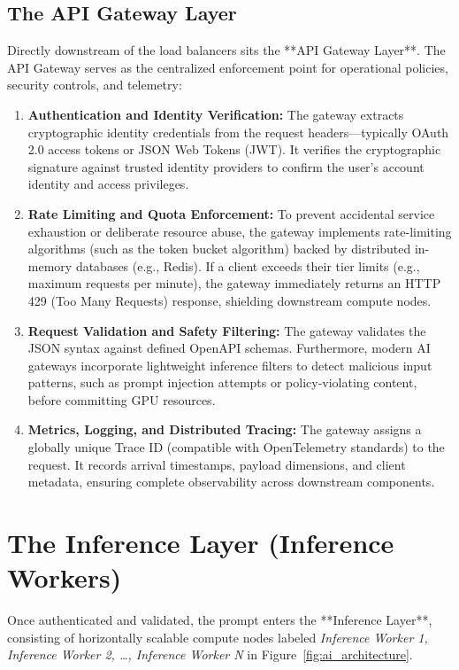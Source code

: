\documentclass[12pt,a4paper]{report}
\begin{document}
\subsection{The API Gateway Layer}
Directly downstream of the load balancers sits the **API Gateway Layer**. The API Gateway serves as the centralized enforcement point for operational policies, security controls, and telemetry:
\begin{enumerate}[leftmargin=1.2cm]
    \item \textbf{Authentication and Identity Verification:} The gateway extracts cryptographic identity credentials from the request headers—typically OAuth 2.0 access tokens or JSON Web Tokens (JWT). It verifies the cryptographic signature against trusted identity providers to confirm the user's account identity and access privileges.
    \item \textbf{Rate Limiting and Quota Enforcement:} To prevent accidental service exhaustion or deliberate resource abuse, the gateway implements rate-limiting algorithms (such as the token bucket algorithm) backed by distributed in-memory databases (e.g., Redis). If a client exceeds their tier limits (e.g., maximum requests per minute), the gateway immediately returns an HTTP 429 (Too Many Requests) response, shielding downstream compute nodes.
    \item \textbf{Request Validation and Safety Filtering:} The gateway validates the JSON syntax against defined OpenAPI schemas. Furthermore, modern AI gateways incorporate lightweight inference filters to detect malicious input patterns, such as prompt injection attempts or policy-violating content, before committing GPU resources.
    \item \textbf{Metrics, Logging, and Distributed Tracing:} The gateway assigns a globally unique Trace ID (compatible with OpenTelemetry standards) to the request. It records arrival timestamps, payload dimensions, and client metadata, ensuring complete observability across downstream components.
\end{enumerate}

\section{The Inference Layer (Inference Workers)}
Once authenticated and validated, the prompt enters the **Inference Layer**, consisting of horizontally scalable compute nodes labeled \textit{Inference Worker 1, Inference Worker 2, \dots, Inference Worker N} in Figure~\ref{fig:ai_architecture}.
\end{document}
